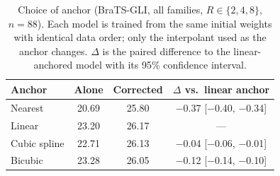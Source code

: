 \begin{table}[pos=t]
\caption{Choice of anchor (BraTS-GLI, all families, $R\in\{2,4,8\}$, $n=88$). Each model is trained from the same initial weights with identical data order; only the interpolant used as the anchor changes. $\Delta$ is the paired difference to the linear-anchored model with its 95\% confidence interval.}
\label{tab:anchor}
\footnotesize\setlength{\tabcolsep}{3pt}
\begin{tabular*}{\columnwidth}{@{\extracolsep{\fill}}lccc@{}}
\toprule
Anchor & Alone & Corrected & $\Delta$ vs.\ linear anchor \\
\midrule
Nearest & 20.69 & 25.80 & $-$0.37 [$-$0.40, $-$0.34] \\
Linear & 23.20 & 26.17 & --- \\
Cubic spline & 22.71 & 26.13 & $-$0.04 [$-$0.06, $-$0.01] \\
Bicubic & 23.28 & 26.05 & $-$0.12 [$-$0.14, $-$0.10] \\
\bottomrule
\end{tabular*}
\end{table}
